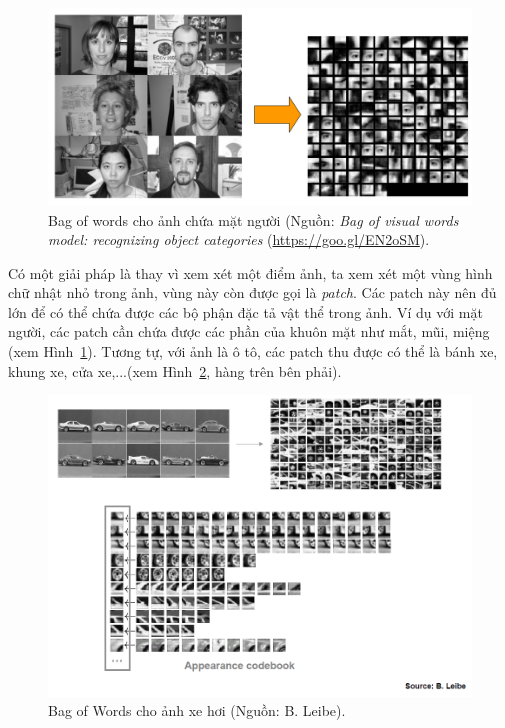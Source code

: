 \begin{figure}[t]
\centering
    \includegraphics[width = \textwidth]{Chapters/01_Overview/11_featureengineering/bow_face.png}
    \caption[]{Bag of words cho ảnh chứa mặt người (Nguồn: \textit{Bag of
    visual words model: recognizing object categories}
    (\url{https://goo.gl/EN2oSM}).}
    \label{fig:11_2}
\end{figure}

Có một giải pháp là thay vì xem xét một điểm ảnh, ta xem xét một vùng hình chữ
nhật nhỏ trong ảnh, vùng này còn được gọi là \textit{patch}. Các patch này nên
đủ lớn để có thể chứa được các bộ phận đặc tả vật thể trong ảnh. Ví dụ với mặt
người, các patch cần chứa được các phần của khuôn mặt như mắt, mũi, miệng (xem
Hình~\ref{fig:11_2}). Tương tự, với ảnh là ô tô, các patch thu được có thể là
bánh xe, khung xe, cửa xe,...(xem Hình~\ref{fig:11_3}, hàng trên bên phải).
\begin{figure}[t]
\centering
    \includegraphics[width = \textwidth]{Chapters/01_Overview/11_featureengineering/bow_car.png}
    \caption[]{Bag of Words cho ảnh xe hơi (Nguồn: B. Leibe).}
    \label{fig:11_3}
\end{figure}
 
